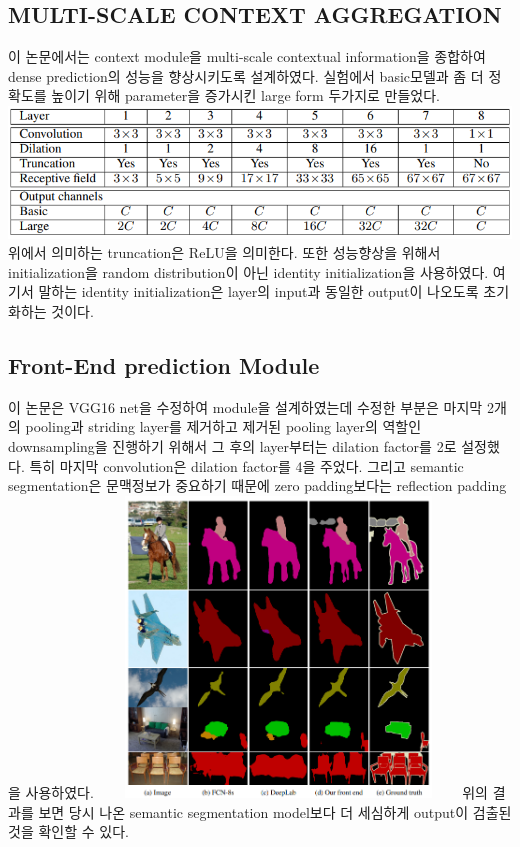 \documentclass[extendedabs]{bmvc2k}
\begin{document}
 \subsection{MULTI-SCALE CONTEXT AGGREGATION}
 \quad 이 논문에서는 context module을 multi-scale contextual information을 종합하여 dense prediction의 성능을 향상시키도록 설계하였다. 
 실험에서 basic모델과 좀 더 정확도를 높이기 위해 parameter을 증가시킨 large form 두가지로 만들었다. 
 \newline  \includegraphics[width=\linewidth]{images/06_D.PNG}
 위에서 의미하는 truncation은 ReLU을 의미한다. 또한 성능향상을 위해서 initialization을 random distribution이 아닌 identity initialization을 사용하였다.
 여기서 말하는 identity initialization은 layer의 input과 동일한 output이 나오도록 초기화하는 것이다. 

 \subsection{Front-End prediction Module}
 \quad 이 논문은 VGG16 net을 수정하여 module을 설계하였는데 수정한 부분은 마지막 2개의 pooling과 striding layer를 제거하고 
 제거된 pooling layer의 역할인 downsampling을 진행하기 위해서 그 후의 layer부터는 dilation factor를 2로 설정했다.
 특히 마지막 convolution은 dilation factor를 4을 주었다. 그리고 semantic segmentation은 문맥정보가 중요하기 때문에 zero padding보다는
 reflection padding을 사용하였다.
 \newline  \includegraphics[width=9.5cm, height=8cm]{images/07_D.PNG}
 \newline 위의 결과를 보면 당시 나온 semantic segmentation model보다 더 세심하게 output이 검출된 것을 확인할 수 있다. 
\end{document}
